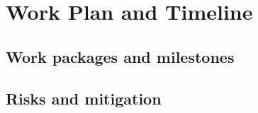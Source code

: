 
\chapter{Work Plan and Timeline}

\section{Work packages and milestones}

\section{Risks and mitigation}
